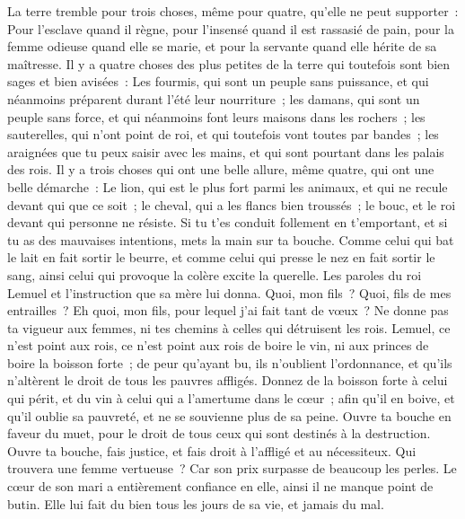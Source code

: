 \begin{multicols}{2}
La terre tremble pour trois choses, même pour quatre, qu'elle ne peut supporter~:
Pour l'esclave quand il règne, pour l'insensé quand il est rassasié de pain,
pour la femme odieuse quand elle se marie, et pour la servante quand elle hérite de sa maîtresse.
Il y a quatre choses des plus petites de la terre qui toutefois sont bien sages et bien avisées~:
Les fourmis, qui sont un peuple sans puissance, et qui néanmoins préparent durant l'été leur nourriture~;
les damans, qui sont un peuple sans force, et qui néanmoins font leurs maisons dans les rochers~;
les sauterelles, qui n'ont point de roi, et qui toutefois vont toutes par bandes~;
les araignées que tu peux saisir avec les mains, et qui sont pourtant dans les palais des rois.
Il y a trois choses qui ont une belle allure, même quatre, qui ont une belle démarche~:
Le lion, qui est le plus fort parmi les animaux, et qui ne recule devant qui que ce soit~;
le cheval, qui a les flancs bien troussés~; le bouc, et le roi devant qui personne ne résiste.
Si tu t'es conduit follement en t'emportant, et si tu as des mauvaises intentions, mets la main sur ta bouche.
Comme celui qui bat le lait en fait sortir le beurre, et comme celui qui presse le nez en fait sortir le sang, ainsi celui qui provoque la colère excite la querelle.
\VerseOne{}Les paroles du roi Lemuel et l'instruction que sa mère lui donna.
Quoi, mon fils~? Quoi, fils de mes entrailles~? Eh quoi, mon fils, pour lequel j'ai fait tant de vœux~?
Ne donne pas ta vigueur aux femmes, ni tes chemins à celles qui détruisent les rois.
Lemuel, ce n'est point aux rois, ce n'est point aux rois de boire le vin, ni aux princes de boire la boisson forte~;
de peur qu'ayant bu, ils n'oublient l'ordonnance, et qu'ils n'altèrent le droit de tous les pauvres affligés.
Donnez de la boisson forte à celui qui périt, et du vin à celui qui a l'amertume dans le cœur~;
afin qu'il en boive, et qu'il oublie sa pauvreté, et ne se souvienne plus de sa peine.
Ouvre ta bouche en faveur du muet, pour le droit de tous ceux qui sont destinés à la destruction.
Ouvre ta bouche, fais justice, et fais droit à l'affligé et au nécessiteux.
 Qui trouvera une femme vertueuse~? Car son prix surpasse de beaucoup les perles.
 Le cœur de son mari a entièrement confiance en elle, ainsi il ne manque point de butin.
 Elle lui fait du bien tous les jours de sa vie, et jamais du mal.

\end{multicols}
